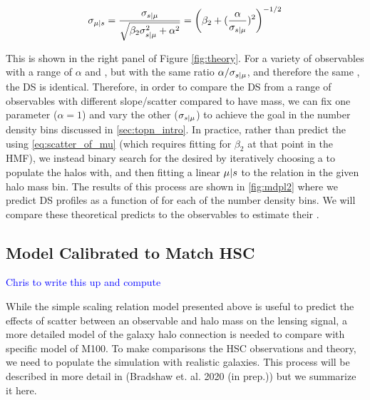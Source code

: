 \documentclass[a4paper,fleqn,usenatbib]{mnras}
\begin{document}
\begin{equation}
    \sigma_{\mu{} | s{}}{} 
    	= \frac{\sigma_{s{} | \mu{}}}{\sqrt{\beta_2 \sigma_{s{} | \mu{}}^2 + \alpha^2}}
        = \left(\beta_2 + (\frac{\alpha}{\sigma_{s{} | \mu{}}})^2\right)^{-1/2}
    \label{eq:ratio_is_what_matters}
\end{equation}

This is shown in the right panel of Figure \ref{fig:theory}. For a variety of observables with a
range of $\alpha$ and \scatterObsSymMhalo{}, but with the same ratio $\alpha /
\sigma_{s{} | \mu{}}$, and therefore the same \scatterMhaloObsSym{}, the DS is identical.
Therefore, in order to compare the DS from a range of observables with different slope/scatter
compared to have mass, we can fix one parameter ($\alpha = 1$) and vary the other
($\sigma_{s{} | \mu{}}$) to achieve the goal \scatterMhaloObsSym{} in the number density bins
discussed in \ref{sec:topn_intro}. In practice, rather than predict the \scatterMhaloObsSym{}
using \ref{eq:scatter_of_mu} (which requires fitting for $\beta_2$ at that point in the HMF), we
instead binary search for the desired \scatterMhaloObsSym{} by iteratively choosing a
\scatterObsSymMhalo{} to populate the halos with, and then fitting a linear $\mu | s$ to
the relation in the given halo mass bin. The results of this process are shown in \ref{fig:mdpl2}
where we predict DS profiles as a function of \scatterMhaloObsSym{} for each of the number
density bins. We will compare these theoretical predicts to the observables to estimate their
\scatterMhaloObsSym{}.

\subsection{Model Calibrated to Match HSC}
    \label{sec:halo_model}

\textcolor{blue}{Chris to write this up and compute}

While the simple scaling relation model presented above is useful to predict the effects of
scatter between an observable and halo mass on the lensing signal, a more detailed model of the
galaxy halo connection is needed to compare with specific model of M100. To make comparisons the
HSC observations and theory, we need to populate the simulation with realistic galaxies. This
process will be described in more detail in (Bradshaw et. al. 2020 (in prep.)) but we summarize
it here.
\end{document}
